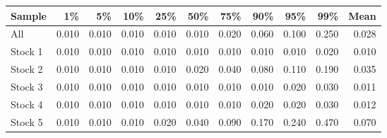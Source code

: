\begin{tabular}{lrrrrrrrrrr}
\toprule
Sample & 1\% & 5\% & 10\% & 25\% & 50\% & 75\% & 90\% & 95\% & 99\% & Mean \\
\midrule
All & 0.010 & 0.010 & 0.010 & 0.010 & 0.010 & 0.020 & 0.060 & 0.100 & 0.250 & 0.028 \\
Stock 1 & 0.010 & 0.010 & 0.010 & 0.010 & 0.010 & 0.010 & 0.010 & 0.010 & 0.020 & 0.010 \\
Stock 2 & 0.010 & 0.010 & 0.010 & 0.010 & 0.020 & 0.040 & 0.080 & 0.110 & 0.190 & 0.035 \\
Stock 3 & 0.010 & 0.010 & 0.010 & 0.010 & 0.010 & 0.010 & 0.010 & 0.020 & 0.030 & 0.011 \\
Stock 4 & 0.010 & 0.010 & 0.010 & 0.010 & 0.010 & 0.010 & 0.020 & 0.020 & 0.030 & 0.012 \\
Stock 5 & 0.010 & 0.010 & 0.010 & 0.020 & 0.040 & 0.090 & 0.170 & 0.240 & 0.470 & 0.070 \\
\bottomrule
\end{tabular}
